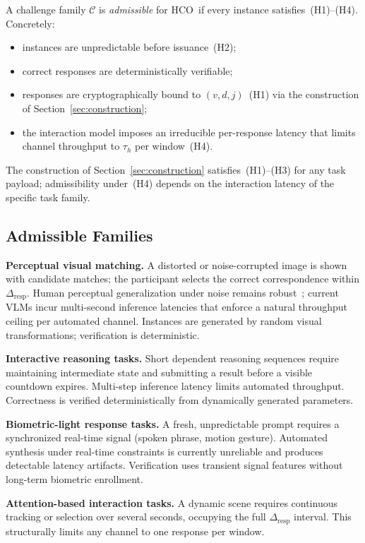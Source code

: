 \documentclass[11pt]{article}
\newcommand{\HCO}{HCO\xspace}
\theoremstyle{remark}
\theoremstyle{plain}
\begin{document}
	A challenge family $\mathcal{C}$ is \emph{admissible} for \HCO\ if
	every instance satisfies~(H1)--(H4). Concretely:
	\begin{itemize}
		\item instances are unpredictable before issuance~(H2);
		\item correct responses are deterministically verifiable;
		\item responses are cryptographically bound to $(v,d,j)$~(H1)
		via the construction of Section~\ref{sec:construction};
		\item the interaction model imposes an irreducible per-response
		latency that limits channel throughput to $\tau_h$ per window~(H4).
	\end{itemize}
	The construction of Section~\ref{sec:construction} satisfies~(H1)--(H3)
	for any task payload; admissibility under~(H4) depends on the interaction
	latency of the specific task family.
	
	\subsection{Admissible Families}
	
	\noindent\textbf{Perceptual visual matching.}
	A distorted or noise-corrupted image is shown with candidate matches;
	the participant selects the correct correspondence within
	$\Delta_{\mathrm{resp}}$. Human perceptual generalization under noise
	remains robust~\cite{geirhos2018generalisation}; current VLMs incur
	multi-second inference latencies that enforce a natural throughput ceiling
	per automated channel. Instances are generated by random visual
	transformations; verification is deterministic.
	
	\noindent\textbf{Interactive reasoning tasks.}
	Short dependent reasoning sequences require maintaining intermediate
	state and submitting a result before a visible countdown expires.
	Multi-step inference latency limits automated throughput. Correctness
	is verified deterministically from dynamically generated parameters.
	
	\noindent\textbf{Biometric-light response tasks.}
	A fresh, unpredictable prompt requires a synchronized real-time signal
	(spoken phrase, motion gesture). Automated synthesis under real-time
	constraints is currently unreliable and produces detectable latency
	artifacts. Verification uses transient signal features without
	long-term biometric enrollment.
	
	\noindent\textbf{Attention-based interaction tasks.}
	A dynamic scene requires continuous tracking or selection over several
	seconds, occupying the full $\Delta_{\mathrm{resp}}$ interval. This
	structurally limits any channel to one response per window.
	
\end{document}
